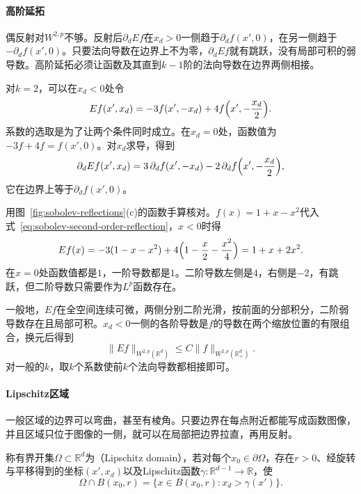 \paragraph{高阶延拓}
偶反射对$W^{2,p}$不够。反射后$\partial_dEf$在$x_d>0$一侧趋于$\partial_df(x',0)$，在另一侧趋于$-\partial_df(x',0)$。只要法向导数在边界上不为零，$\partial_dEf$就有跳跃，没有局部可积的弱导数。高阶延拓必须让函数及其直到$k-1$阶的法向导数在边界两侧相接。

对$k=2$，可以在$x_d<0$处令
\begin{equation}
Ef(x',x_d)=-3f(x',-x_d)+4f\Bigl(x',-\frac{x_d}{2}\Bigr).
\label{eq:sobolev-second-order-reflection}
\end{equation}
系数的选取是为了让两个条件同时成立。在$x_d=0$处，函数值为$-3f+4f=f(x',0)$。对$x_d$求导，得到
\[
\partial_dEf(x',x_d)=3\,\partial_df(x',-x_d)-2\,\partial_df\Bigl(x',-\frac{x_d}2\Bigr),
\]
它在边界上等于$\partial_df(x',0)$。

用图~\ref{fig:sobolev-reflections}(c)的函数手算核对。$f(x)=1+x-x^2$代入式~\eqref{eq:sobolev-second-order-reflection}，$x<0$时得
\[
Ef(x)=-3(1-x-x^2)+4\Bigl(1-\frac x2-\frac{x^2}4\Bigr)=1+x+2x^2 .
\]
在$x=0$处函数值都是$1$，一阶导数都是$1$。二阶导数左侧是$4$，右侧是$-2$，有跳跃，但二阶导数只需要作为$L^p$函数存在。

一般地，$Ef$在全空间连续可微，两侧分别二阶光滑，按前面的分部积分，二阶弱导数存在且局部可积。$x_d<0$一侧的各阶导数是$f$的导数在两个缩放位置的有限组合，换元后得到
\[
\lVert Ef\rVert_{W^{2,p}(\mathbb R^d)}\leq C\lVert f\rVert_{W^{2,p}(\mathbb R^d_+)} .
\]
对一般的$k$，取$k$个系数使前$k$个法向导数都相接即可。

\paragraph{Lipschitz区域}
一般区域的边界可以弯曲，甚至有棱角。只要边界在每点附近都能写成函数图像，并且区域只位于图像的一侧，就可以在局部把边界拉直，再用反射。

\begin{definition}[Lipschitz区域]
\label{def:sobolev-lipschitz-domain}
称有界开集$\Omega\subset\mathbb R^d$为（Lipschitz domain），若对每个$x_0\in\partial\Omega$，存在$r>0$、经旋转与平移得到的坐标$(x',x_d)$以及Lipschitz函数$\gamma:\mathbb R^{d-1}\to\mathbb R$，使
\begin{equation}
\Omega\cap B(x_0,r)=\{x\in B(x_0,r):x_d>\gamma(x')\}.
\label{eq:sobolev-lipschitz-graph}
\end{equation}
\end{definition}

